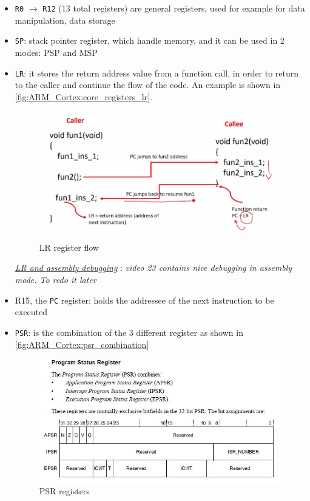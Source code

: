 \begin{itemize}
    \item \verb|R0| $\rightarrow$ \verb|R12| (13 total registers) are general registers, used for example for data manipulation, data storage

    \item \verb|SP|: stack pointer register, which handle memory, and it can be used in 2 modes: PSP and MSP

    \item \verb|LR|: it stores the return address value from a function call, in order to return to the caller and continue the flow of the code. An example is shown in \autoref{fig:ARM_Cortex:core_registers_lr}.

\begin{figure}[h]
\centering
\includegraphics[scale=0.5]{Figures/ARM_Cortex/core_registers_lr}
\caption{LR register flow}
\label{fig:ARM_Cortex:core_registers_lr}
\end{figure}

     \underline{\textit{LR and assembly debugging}} : \textit{video 23 contains nice debugging in assembly mode. To redo it later}

    \item R15, the \verb|PC| register: holds the addressee of the next instruction to be executed

\newpage
    \item \verb|PSR|: is the combination of the 3 different register as shown in \autoref{fig:ARM_Cortex:psr_combination}

\begin{figure}[h]
\centering
\includegraphics[scale=0.7]{Figures/ARM_Cortex/psr_combination}
\caption{PSR registers}
\label{fig:ARM_Cortex:psr_combination}
\end{figure}


\end{itemize}
